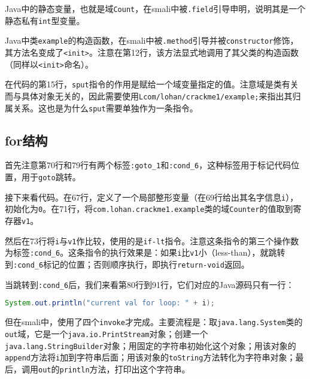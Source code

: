 Java中的静态变量，也就是域\lstinline!Count!，在smali中被\lstinline!.field!引导申明，说明其是一个静态私有\lstinline!int!型变量。

Java中类\lstinline!example!的构造函数，在smali中被\lstinline!.method!引导并被\lstinline!constructor!修饰，其方法名变成了\lstinline!<init>!。注意在第12行，该方法显式地调用了其父类的构造函数（同样以\lstinline!<init>!命名）。

在代码的第15行，\lstinline!sput!指令的作用是赋给一个域变量指定的值。注意域是类有关而与具体对象无关的，因此需要使用\lstinline!Lcom/lohan/crackme1/example;!来指出其归属关系。这也是为什么\lstinline!sput!需要单独作为一条指令。

\subsection{for结构}
\label{SubSec:dalvik-smali-for}




首先注意第70行和79行有两个标签\lstinline!:goto_1!和\lstinline!:cond_6!，这种标签用于标记代码位置，用于\lstinline!goto!跳转。

接下来看代码。在67行，定义了一个局部整形变量（在69行给出其名字信息\lstinline!i!），初始化为\lstinline!0!。在71行，将\lstinline!com.lohan.crackme1.example!类的域\lstinline!Counter!的值取到寄存器\lstinline!v1!。

然后在73行将\lstinline!i!与\lstinline!v1!作比较，使用的是\lstinline!if-lt!指令。注意这条指令的第三个操作数为标签\lstinline!:cond_6!。这条指令的执行效果是：如果\lstinline!i!比\lstinline!v1!小（less-than），就跳转到\lstinline!:cond_6!标记的位置；否则顺序执行，即执行\lstinline!return-void!返回。

当跳转到\lstinline!:cond_6!后，我们来看第80行到91行，它们对应的Java源码只有一行：
\begin{lstlisting}[language=java, numbers=none]
System.out.println("current val for loop: " + i);
\end{lstlisting}
但在smali中，使用了四个\lstinline!invoke!才完成。主要流程是：取\lstinline!java.lang.System!类的\lstinline!out!域，它是一个\lstinline!java.io.PrintStream!对象；创建一个\lstinline!java.lang.StringBuilder!对象；用固定的字符串初始化这个对象；用该对象的\lstinline!append!方法将\lstinline!i!加到字符串后面；用该对象的\lstinline!toString!方法转化为字符串对象；最后，调用\lstinline!out!的\lstinline!println!方法，打印出这个字符串。

